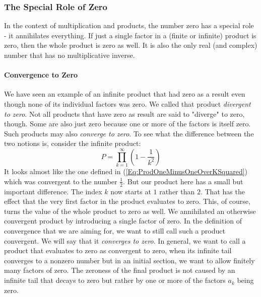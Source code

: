 \subsubsection{The Special Role of Zero}
In the context of multiplication and products, the number zero has a special role - it annihilates everything. If just a single factor in a (finite or infinite) product is zero, then the whole product is zero as well. It is also the only real (and complex) number that has no multiplicative inverse.

\paragraph{Convergence to Zero}
We have seen an example of an infinite product that had zero as a result even though none of its individual factors was zero. We called that product \emph{divergent to zero}. Not all products that have zero as result are said to "diverge" to zero, though. Some are also just zero because one or more of the factors is itself zero. Such products may also \emph{converge to zero}. To see what the difference between the two notions is, consider the infinite product:
\begin{equation}
P = \prod_{k=1}^{\infty} \left(1 - \frac{1}{k^2} \right)
\end{equation}
It looks almost like the one defined in (\ref{Eq:ProdOneMinusOneOverKSquared}) which was convergent to the number $\frac{1}{2}$. But our product here has a small but important difference. The index $k$ now starts at $1$ rather than $2$. That has the effect that the very first factor in the product evaluates to zero. This, of course, turns the value of the whole product to zero as well. We annihilated an otherwise convergent product by introducing a single factor of zero. In the definition of convergence that we are aiming for, we want to still call such a product convergent. We will say that it \emph{converges to zero}. In general, we want to call a product that evaluates to zero as convergent to zero, when its infinite tail converges to a nonzero number but in an initial section, we want to allow finitely many factors of zero. The zeroness of the final product is not caused by an infinite tail that decays to zero but rather by one or more of the factors $a_k$ being zero.

